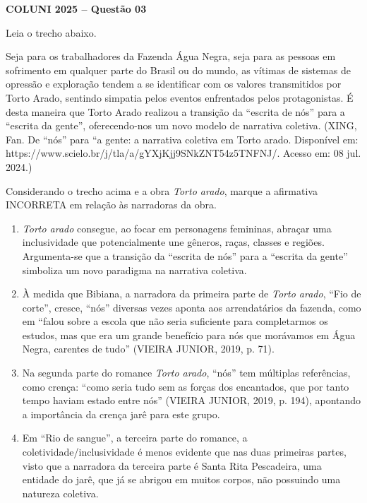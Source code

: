 \textbf{COLUNI 2025 -- Questão 03}\par\medskip Leia o trecho abaixo.

\par

Seja para os trabalhadores da Fazenda Água Negra, seja para as pessoas em sofrimento em qualquer parte do Brasil ou do mundo, as vítimas de sistemas de opressão e exploração tendem a se identificar com os valores transmitidos por Torto Arado, sentindo simpatia pelos eventos enfrentados pelos protagonistas. É desta maneira que Torto Arado realizou a transição da “escrita de nós” para a “escrita da gente”, oferecendo-nos um novo modelo de narrativa coletiva. (XING, Fan. De “nós” para “a gente: a narrativa coletiva em                                Torto   arado.    Disponível     em: https://www.scielo.br/j/tla/a/gYXjKjj9SNkZNT54z5TNFNJ/. Acesso em: 08 jul. 2024.)

\par

Considerando o trecho acima e a obra \textit{Torto arado}, marque a afirmativa INCORRETA em relação às narradoras da obra.\begin{enumerate}
\item \textit{Torto arado} consegue, ao focar em personagens femininas, abraçar uma inclusividade que
       potencialmente une gêneros, raças, classes e regiões. Argumenta-se que a transição da “escrita de nós”
       para a “escrita da gente” simboliza um novo paradigma na narrativa coletiva.
\item À medida que Bibiana, a narradora da primeira parte de \textit{Torto arado}, “Fio de corte”, cresce, “nós” diversas
       vezes aponta aos arrendatários da fazenda, como em “falou sobre a escola que não seria suficiente para
       completarmos os estudos, mas que era um grande benefício para nós que morávamos em Água Negra,
       carentes de tudo” (VIEIRA JUNIOR, 2019, p. 71).
\item Na segunda parte do romance \textit{Torto arado}, “nós” tem múltiplas referências, como crença: “como seria
       tudo sem as forças dos encantados, que por tanto tempo haviam estado entre nós” (VIEIRA JUNIOR,
       2019, p. 194), apontando a importância da crença jarê para este grupo.
\item Em “Rio de sangue”, a terceira parte do romance, a coletividade/inclusividade é menos evidente que nas
       duas primeiras partes, visto que a narradora da terceira parte é Santa Rita Pescadeira, uma entidade do
       jarê, que já se abrigou em muitos corpos, não possuindo uma natureza coletiva.\end{enumerate}
